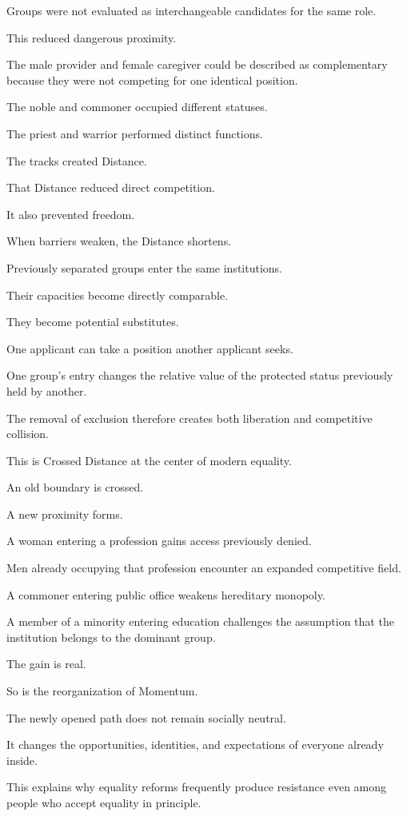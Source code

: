 Groups were not evaluated as interchangeable candidates for the same role.

This reduced dangerous proximity.

The male provider and female caregiver could be described as complementary because they were not competing for one identical position.

The noble and commoner occupied different statuses.

The priest and warrior performed distinct functions.

The tracks created Distance.

That Distance reduced direct competition.

It also prevented freedom.

When barriers weaken, the Distance shortens.

Previously separated groups enter the same institutions.

Their capacities become directly comparable.

They become potential substitutes.

One applicant can take a position another applicant seeks.

One group’s entry changes the relative value of the protected status previously held by another.

The removal of exclusion therefore creates both liberation and competitive collision.

This is Crossed Distance at the center of modern equality.

An old boundary is crossed.

A new proximity forms.

A woman entering a profession gains access previously denied.

Men already occupying that profession encounter an expanded competitive field.

A commoner entering public office weakens hereditary monopoly.

A member of a minority entering education challenges the assumption that the institution belongs to the dominant group.

The gain is real.

So is the reorganization of Momentum.

The newly opened path does not remain socially neutral.

It changes the opportunities, identities, and expectations of everyone already inside.

This explains why equality reforms frequently produce resistance even among people who accept equality in principle.

